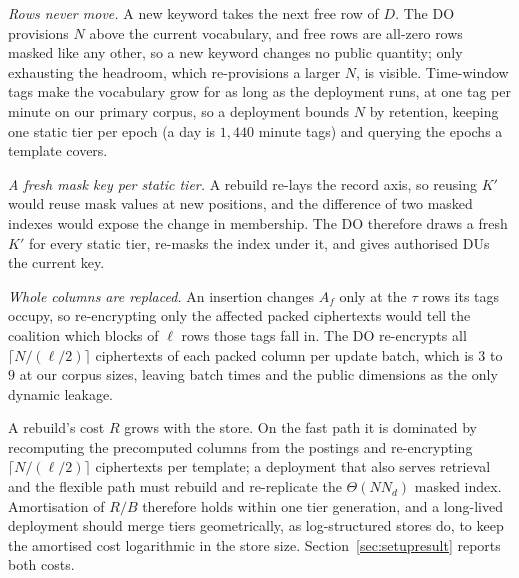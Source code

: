 \documentclass[a4paper,fleqn]{cas-sc}
\begin{document}
\emph{Rows never move.} A new keyword takes the next free row of $D$. The DO
provisions $N$ above the current vocabulary, and free rows are all-zero rows
masked like any other, so a new keyword changes no public quantity; only
exhausting the headroom, which re-provisions a larger $N$, is visible.
Time-window tags make the vocabulary grow for as long as the deployment runs,
at one tag per minute on our primary corpus, so a deployment bounds $N$ by
retention, keeping one static tier per epoch (a day is $1{,}440$ minute tags)
and querying the epochs a template covers.

\emph{A fresh mask key per static tier.} A rebuild re-lays the record axis, so
reusing $K'$ would reuse mask values at new positions, and the difference of
two masked indexes would expose the change in membership. The DO therefore
draws a fresh $K'$ for every static tier, re-masks the index under it, and
gives authorised DUs the current key.

\emph{Whole columns are replaced.} An insertion changes $A_f$ only at the
$\tau$ rows its tags occupy, so re-encrypting only the affected packed
ciphertexts would tell the coalition which blocks of $\ell$ rows those tags
fall in. The DO re-encrypts all $\lceil N/(\ell/2)\rceil$ ciphertexts of
each packed column per update batch, which is $3$ to $9$ at our corpus sizes,
leaving batch times and the public dimensions as the only dynamic leakage.

A rebuild's cost $R$ grows with the store. On the fast path it is dominated by
recomputing the precomputed columns from the postings and re-encrypting
$\lceil N/(\ell/2)\rceil$ ciphertexts per template; a deployment that also
serves retrieval and the flexible path must rebuild and re-replicate the
$\Theta(N N_d)$ masked index. Amortisation of $R/B$ therefore holds within one tier generation, and a
long-lived deployment should merge tiers geometrically, as log-structured
stores do, to keep the amortised cost logarithmic in the store size.
Section~\ref{sec:setupresult} reports both costs.
\end{document}
